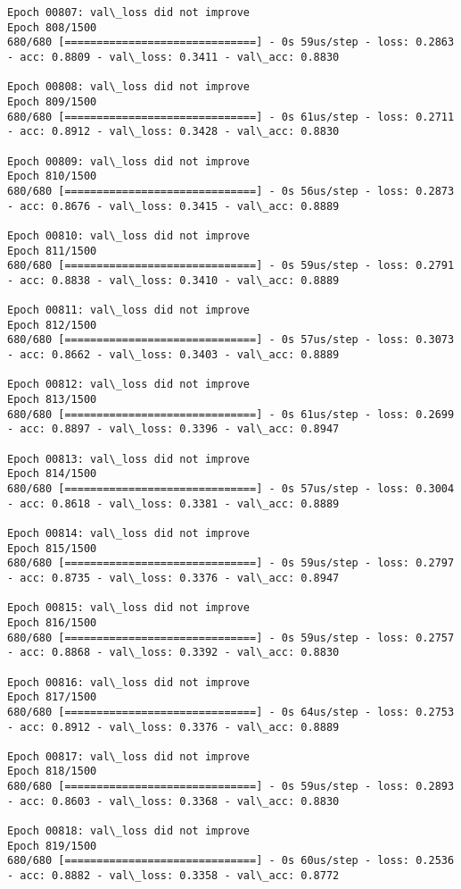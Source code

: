 \documentclass[11pt]{article}
\begin{document}
\begin{Verbatim}[commandchars=\\\{\}]
Epoch 00807: val\_loss did not improve
Epoch 808/1500
680/680 [==============================] - 0s 59us/step - loss: 0.2863 - acc: 0.8809 - val\_loss: 0.3411 - val\_acc: 0.8830

Epoch 00808: val\_loss did not improve
Epoch 809/1500
680/680 [==============================] - 0s 61us/step - loss: 0.2711 - acc: 0.8912 - val\_loss: 0.3428 - val\_acc: 0.8830

Epoch 00809: val\_loss did not improve
Epoch 810/1500
680/680 [==============================] - 0s 56us/step - loss: 0.2873 - acc: 0.8676 - val\_loss: 0.3415 - val\_acc: 0.8889

Epoch 00810: val\_loss did not improve
Epoch 811/1500
680/680 [==============================] - 0s 59us/step - loss: 0.2791 - acc: 0.8838 - val\_loss: 0.3410 - val\_acc: 0.8889

Epoch 00811: val\_loss did not improve
Epoch 812/1500
680/680 [==============================] - 0s 57us/step - loss: 0.3073 - acc: 0.8662 - val\_loss: 0.3403 - val\_acc: 0.8889

Epoch 00812: val\_loss did not improve
Epoch 813/1500
680/680 [==============================] - 0s 61us/step - loss: 0.2699 - acc: 0.8897 - val\_loss: 0.3396 - val\_acc: 0.8947

Epoch 00813: val\_loss did not improve
Epoch 814/1500
680/680 [==============================] - 0s 57us/step - loss: 0.3004 - acc: 0.8618 - val\_loss: 0.3381 - val\_acc: 0.8889

Epoch 00814: val\_loss did not improve
Epoch 815/1500
680/680 [==============================] - 0s 59us/step - loss: 0.2797 - acc: 0.8735 - val\_loss: 0.3376 - val\_acc: 0.8947

Epoch 00815: val\_loss did not improve
Epoch 816/1500
680/680 [==============================] - 0s 59us/step - loss: 0.2757 - acc: 0.8868 - val\_loss: 0.3392 - val\_acc: 0.8830

Epoch 00816: val\_loss did not improve
Epoch 817/1500
680/680 [==============================] - 0s 64us/step - loss: 0.2753 - acc: 0.8912 - val\_loss: 0.3376 - val\_acc: 0.8889

Epoch 00817: val\_loss did not improve
Epoch 818/1500
680/680 [==============================] - 0s 59us/step - loss: 0.2893 - acc: 0.8603 - val\_loss: 0.3368 - val\_acc: 0.8830

Epoch 00818: val\_loss did not improve
Epoch 819/1500
680/680 [==============================] - 0s 60us/step - loss: 0.2536 - acc: 0.8882 - val\_loss: 0.3358 - val\_acc: 0.8772


\end{Verbatim}
\end{document}
